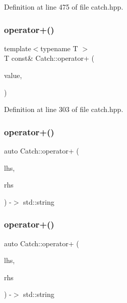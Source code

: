 Definition at line 475 of file catch.\+hpp.

\mbox{\label{namespace_catch_a5e95b3c47a7618db3649dc39b0bb9004}} 
\subsubsection{\texorpdfstring{operator+()}{operator+()}\hspace{0.1cm}{\footnotesize\ttfamily [1/4]}}
{\footnotesize\ttfamily template$<$typename T $>$ \\
T const\& Catch\+::operator+ (\begin{DoxyParamCaption}\item[{T const \&}]{value,  }\item[{\mbox{\hyperlink{struct_catch_1_1_stream_end_stop}{Stream\+End\+Stop}}}]{ }\end{DoxyParamCaption})}



Definition at line 303 of file catch.\+hpp.

\mbox{\label{namespace_catch_a3a766cb0b8c792c9151baaaf1e8003eb}} 
\subsubsection{\texorpdfstring{operator+()}{operator+()}\hspace{0.1cm}{\footnotesize\ttfamily [2/4]}}
{\footnotesize\ttfamily auto Catch\+::operator+ (\begin{DoxyParamCaption}\item[{\mbox{\hyperlink{class_catch_1_1_string_ref}{String\+Ref}} const \&}]{lhs,  }\item[{\mbox{\hyperlink{class_catch_1_1_string_ref}{String\+Ref}} const \&}]{rhs }\end{DoxyParamCaption}) -\/$>$  std\+::string}

\mbox{\label{namespace_catch_ab7bdb68d0e4329df79e293f9207b55e9}} 
\subsubsection{\texorpdfstring{operator+()}{operator+()}\hspace{0.1cm}{\footnotesize\ttfamily [3/4]}}
{\footnotesize\ttfamily auto Catch\+::operator+ (\begin{DoxyParamCaption}\item[{\mbox{\hyperlink{class_catch_1_1_string_ref}{String\+Ref}} const \&}]{lhs,  }\item[{char const $\ast$}]{rhs }\end{DoxyParamCaption}) -\/$>$  std\+::string}

